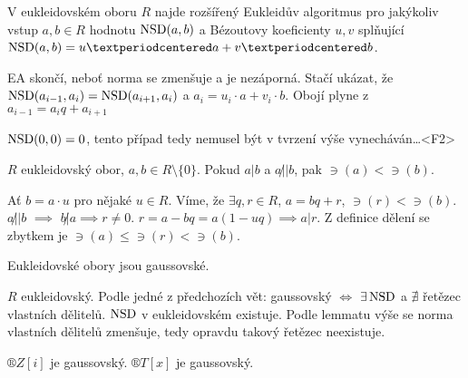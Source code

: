 \documentclass[12pt]{article}                   %
\begin{document}
        \begin{veta}
            V eukleidovském oboru $R$ najde rozšířený Eukleidův algoritmus pro jakýkoliv vstup $a, b \in R$ hodnotu $\operatorname{NSD}(a, b)$ a Bézoutovy koeficienty $u, v$ splňující $\NSD(a, b) = u·a + v·b$.

            \begin{dukazin}
                EA skončí, neboť norma se zmenšuje a je nezáporná. Stačí ukázat, že $\operatorname{NSD}(a_{i-1}, a_i) = \operatorname{NSD}(a_{i+1}, a_i)$ a $a_i = u_i·a + v_i·b$. Obojí plyne z $a_{i-1} = a_{i}q+a_{i+1}$
            \end{dukazin}
        \end{veta}


        \begin{poznamka}[Oprava]
            $\operatorname{NSD}(0, 0) = 0$, tento případ tedy nemusel být v tvrzení výše vynecháván…<F2> 
        \end{poznamka}

        \begin{lemma}
            $R$ eukleidovský obor, $a, b \in R \setminus \{0\}$. Pokud $a|b$ a $a \not|| b$, pak $\ni(a) < \ni(b)$.

            \begin{dukazin}
                Ať $b = a·u$ pro nějaké $u \in R$. Víme, že $\exists q, r \in R$, $a = bq + r$, $\ni(r) < \ni(b)$. $a\not||b$ $\implies$ $b \not|a \implies r≠0$. $r = a-bq = a(1-uq) \implies a|r$. Z definice dělení se zbytkem je $\ni(a) ≤ \ni(r) < \ni(b)$.
            \end{dukazin}
        \end{lemma}

        \begin{veta}
            Eukleidovské obory jsou gaussovské.

            \begin{dukazin}
                $R$ eukleidovský. Podle jedné z předchozích vět: gaussovský $\Leftrightarrow$ $\exists \operatorname{NSD}$ a $\nexists$ řetězec vlastních dělitelů. $\operatorname{NSD}$ v eukleidovském existuje. Podle lemmatu výše se norma vlastních dělitelů zmenšuje, tedy opravdu takový řetězec neexistuje.
            \end{dukazin}
        \end{veta}

        \begin{dusledek}
            $®Z[i]$ je gaussovský. $®T[x]$ je gaussovský.
        \end{dusledek}
\end{document}
